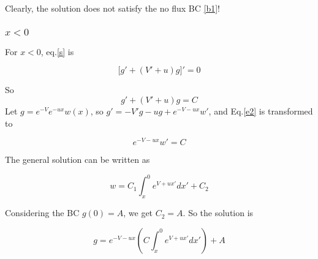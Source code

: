 \documentclass{../Templetes/1c}
\begin{document}
Clearly, the solution \label{d3} does not satisfy the no flux BC \eqref{b1}!

\subsubsection{$x<0$}
For $x<0$, eq.\eqref{s} is 

\begin{equation} \label{e}
\big[
g'+(V'+u)g
\big]'=0
\end{equation}

So
\begin{equation} \label{e2}
g'+(V'+u)g=C
\end{equation}
Let $g=e^{-V}e^{-ux}w(x)$, so $g'=-V'g-ug+e^{-V-ux}w'$, and Eq.\eqref{e2} is transformed to 

\begin{equation}
   e^{-V-ux}w'=C
\end{equation}

The general solution can be written as

\begin{equation}
   w=C_1\int_x^0 e^{V+ux'}dx'+C_2 
\end{equation}

Considering the BC $g(0)=A$, we get $C_2=A$. So the solution is

\begin{equation}
    g=e^{-V-ux} (C\int_x^0 e^{V+ux'}dx')+A
\end{equation}  
\end{document}
